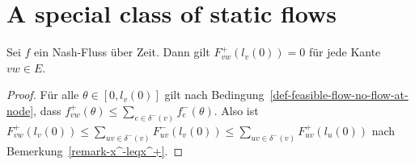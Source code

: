 \section{A special class of static flows}

\begin{lemma}\label{lemma-no-inflow-until-l}
	Sei $f$ ein Nash-Fluss über Zeit.
	Dann gilt $F_{vw}^+(l_v(0)) = 0$ für jede Kante $vw\in E$.
\end{lemma}
\begin{proof}
	Für alle $\theta\in [0, l_v(0)]$ gilt nach Bedingung~\ref{def-feasible-flow-no-flow-at-node}, dass $f_{vw}^+(\theta) \leq \sum_{e\in\delta^-(v)} f_e^-(\theta)$.
	Also ist $F_{vw}^+(l_v(0)) \leq \sum_{uv\in\delta^-(v)} F_{uv}^-(l_v(0))\leq \sum_{uv\in\delta^-(v)} F_{uv}^+(l_u(0))$ nach Bemerkung~\ref{remark-x^-leqx^+}.
\end{proof}

